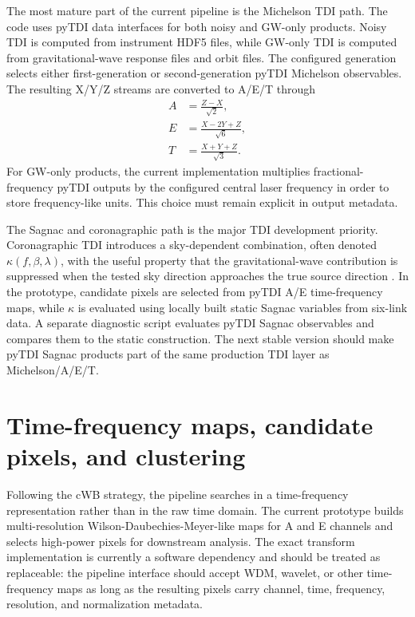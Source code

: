 \documentclass[%
 reprint,
 amsmath,amssymb,
 aps,
 prd,
]{revtex4-2}
\begin{document}
The most mature part of the current pipeline is the Michelson TDI path.  The code uses pyTDI data interfaces for both noisy and GW-only products.  Noisy TDI is computed from instrument HDF5 files, while GW-only TDI is computed from gravitational-wave response files and orbit files.  The configured generation selects either first-generation or second-generation pyTDI Michelson observables.  The resulting X/Y/Z streams are converted to A/E/T through
\begin{align}
A &= \frac{Z-X}{\sqrt{2}}, \\
E &= \frac{X-2Y+Z}{\sqrt{6}}, \\
T &= \frac{X+Y+Z}{\sqrt{3}}.
\label{eq:aet}
\end{align}
For GW-only products, the current implementation multiplies fractional-frequency pyTDI outputs by the configured central laser frequency in order to store frequency-like units.  This choice must remain explicit in output metadata.

The Sagnac and coronagraphic path is the major TDI development priority.  Coronagraphic TDI introduces a sky-dependent combination, often denoted $\kappa(f,\beta,\lambda)$, with the useful property that the gravitational-wave contribution is suppressed when the tested sky direction approaches the true source direction \cite{CostaBarroso2024Coronagraphic}.  In the prototype, candidate pixels are selected from pyTDI A/E time-frequency maps, while $\kappa$ is evaluated using locally built static Sagnac variables from six-link data.  A separate diagnostic script evaluates pyTDI Sagnac observables and compares them to the static construction.  The next stable version should make pyTDI Sagnac products part of the same production TDI layer as Michelson/A/E/T.

\section{Time-frequency maps, candidate pixels, and clustering}
\label{sec:tf}

Following the cWB strategy, the pipeline searches in a time-frequency representation rather than in the raw time domain.  The current prototype builds multi-resolution Wilson-Daubechies-Meyer-like maps for A and E channels and selects high-power pixels for downstream analysis.  The exact transform implementation is currently a software dependency and should be treated as replaceable: the pipeline interface should accept WDM, wavelet, or other time-frequency maps as long as the resulting pixels carry channel, time, frequency, resolution, and normalization metadata.
\end{document}
